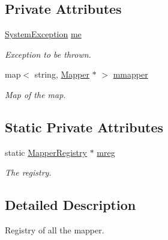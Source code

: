 \subsection*{Private Attributes}
\begin{DoxyCompactItemize}
\item 
\hypertarget{classMapperRegistry_aece7a418978de9d026f80770b865f61d}{
\hyperlink{classSystemException}{SystemException} \hyperlink{classMapperRegistry_aece7a418978de9d026f80770b865f61d}{me}}
\label{classMapperRegistry_aece7a418978de9d026f80770b865f61d}

\begin{DoxyCompactList}\small\item\em Exception to be thrown. \item\end{DoxyCompactList}\item 
\hypertarget{classMapperRegistry_a1adafaecf38583be60f1ee48fae5366c}{
map$<$ string, \hyperlink{classMapper}{Mapper} $\ast$ $>$ \hyperlink{classMapperRegistry_a1adafaecf38583be60f1ee48fae5366c}{mmapper}}
\label{classMapperRegistry_a1adafaecf38583be60f1ee48fae5366c}

\begin{DoxyCompactList}\small\item\em Map of the map. \item\end{DoxyCompactList}\end{DoxyCompactItemize}
\subsection*{Static Private Attributes}
\begin{DoxyCompactItemize}
\item 
\hypertarget{classMapperRegistry_a4805bcdd59bd36fe7f3e700031e59c98}{
static \hyperlink{classMapperRegistry}{MapperRegistry} $\ast$ \hyperlink{classMapperRegistry_a4805bcdd59bd36fe7f3e700031e59c98}{mreg}}
\label{classMapperRegistry_a4805bcdd59bd36fe7f3e700031e59c98}

\begin{DoxyCompactList}\small\item\em The registry. \item\end{DoxyCompactList}\end{DoxyCompactItemize}


\subsection{Detailed Description}
Registry of all the mapper. 


